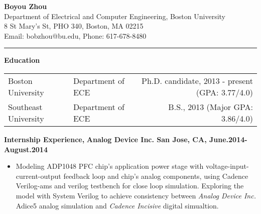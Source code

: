 \documentclass[]{article}
\begin{document}
\pagestyle{empty}
\begin{center}
\vspace{-0.2in}
{\large\textbf{Boyou Zhou}}\\
Department of Electrical and Computer Engineering, Boston University\\
8 St Mary's St, PHO 340, Boston, MA 02215\\
Email: bobzhou@bu.edu, Phone: 617-678-8480\\
\rule[-0.1cm]{7.5in}{0.01cm}
\end{center}
%

\textbf{Education}
\vspace{-0.1in}
\begin{table*}[h]
  \begin{tabular}{p{2.0in}p{2.0in}r}
    Boston University& Department of ECE & Ph.D. candidate, 2013 - present
    (GPA: 3.77/4.0)\\ 
    Southeast University & Department of ECE & B.S., 2013
    (Major GPA: 3.86/4.0)\\ 
  \end{tabular}
  \label{tbl:1}
\end{table*}

\vspace{-0.1in}
\noindent \textbf{Internship Experience,}
\textbf{Analog Device Inc. San Jose, CA, June.2014-August.2014}
    \begin{itemize}
        \item Modeling ADP1048 PFC chip's application power stage with
        voltage-input-current-output feedback loop and chip's analog components,
        using Cadence Verilog-ams and verilog testbench for close loop
        simulation. Exploring the model with System Verilog to achieve
        consistency between \textit{Analog Device Inc.} Adice5 analog simulation
        and \textit{Cadence Incisive} digital simualtion. 
    \end{itemize}
\end{document}
